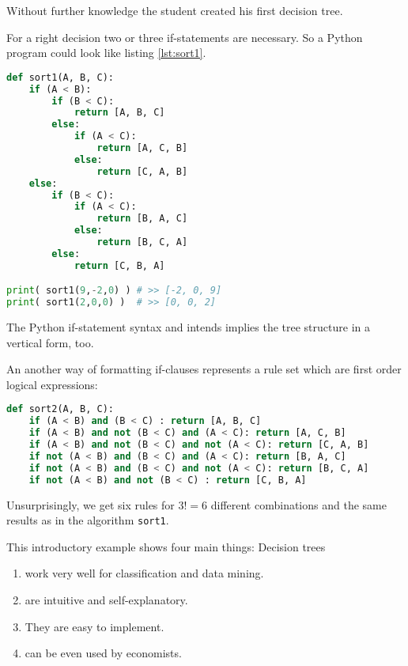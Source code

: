 Without further knowledge the student created his first decision tree.

For a right decision two or three if-statements are necessary. So a Python program could look like listing \ref{lst:sort1}.

\newpage

\begin{lstlisting}[style = siemens, language = Python, caption={[A Python implementation of a decision tree for sorting three elements]A Python implementation of a decision tree for sorting three elements $A, B, C$},label=lst:sort1]
def sort1(A, B, C):
	if (A < B):
		if (B < C):
			return [A, B, C]
		else:
			if (A < C):
				return [A, C, B]
			else:
				return [C, A, B]
	else:
		if (B < C):
			if (A < C):
				return [B, A, C]
			else:
				return [B, C, A]
		else:
			return [C, B, A]

print( sort1(9,-2,0) ) # >> [-2, 0, 9]
print( sort1(2,0,0) )  # >> [0, 0, 2]
\end{lstlisting}

\begin{remark}
    The Python if-statement syntax and intends implies the tree structure in a vertical form, too.      
\end{remark}

An another way of formatting if-clauses represents a rule set which are first order logical expressions:  
    \begin{lstlisting}[style = siemens, language = Python, caption={A Python reimplementation of the decision tree given in listing \ref{lst:sort1} as a set of first order logical rules},label=lst:sort2]
def sort2(A, B, C):
	if (A < B) and (B < C) : return [A, B, C]
	if (A < B) and not (B < C) and (A < C): return [A, C, B]
	if (A < B) and not (B < C) and not (A < C): return [C, A, B]
	if not (A < B) and (B < C) and (A < C): return [B, A, C]
	if not (A < B) and (B < C) and not (A < C): return [B, C, A]
	if not (A < B) and not (B < C) : return [C, B, A]
\end{lstlisting}

Unsurprisingly, we get six rules for $3! = 6$ different combinations and the same results as in the algorithm \texttt{sort1}. 


This introductory example shows four main things: Decision trees
\begin{enumerate}
    \item work very well for classification and data mining.
    \item are intuitive and self-explanatory.
    \item They are easy to implement.
    \item can be even used by economists.
\end{enumerate}

